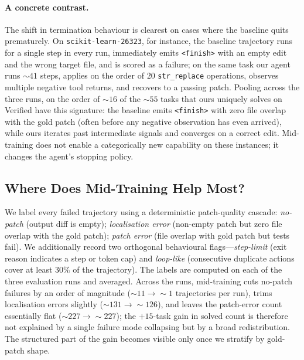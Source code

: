 \paragraph{A concrete contrast.}
The shift in termination behaviour is clearest on cases where the baseline
quits prematurely. On \texttt{scikit-learn-26323}, for instance, the
baseline trajectory runs for a single step in every run, immediately emits
\texttt{<finish>} with an empty edit and the wrong target file, and is
scored as a failure; on the same task our agent runs $\sim\!41$ steps,
applies on the order of $20$ \texttt{str\_replace} operations, observes
multiple negative tool returns, and recovers to a passing patch. Pooling
across the three runs, on the order of $\sim\!16$ of the $\sim\!55$ tasks
that ours uniquely solves on Verified have this signature: the baseline
emits \texttt{<finish>} with zero file overlap with the gold patch (often
before any negative observation has even arrived), while ours iterates past
intermediate signals and converges on a correct edit. Mid-training does not
enable a categorically new capability on these instances; it changes the
agent's stopping policy.


\subsection{Where Does Mid-Training Help Most?}
\label{sec:analysis:failure}

We label every failed trajectory using a deterministic patch-quality
cascade: \emph{no-patch} (output diff is empty); \emph{localisation error}
(non-empty patch but zero file overlap with the gold patch); \emph{patch
error} (file overlap with gold patch but tests fail). We additionally
record two orthogonal behavioural flags---\emph{step-limit} (exit reason
indicates a step or token cap) and \emph{loop-like} (consecutive duplicate
actions cover at least $30\%$ of the trajectory). The labels are computed
on each of the three evaluation runs and averaged. Across the runs,
mid-training cuts no-patch failures by an order of magnitude
($\sim\!11 \to \sim\!1$ trajectories per run), trims localisation errors
slightly ($\sim\!131 \to \sim\!126$), and leaves the patch-error count
essentially flat ($\sim\!227 \to \sim\!227$); the $+15$-task gain in solved
count is therefore not explained by a single failure mode collapsing but by
a broad redistribution. The structured part of the gain becomes visible only
once we stratify by gold-patch shape.

